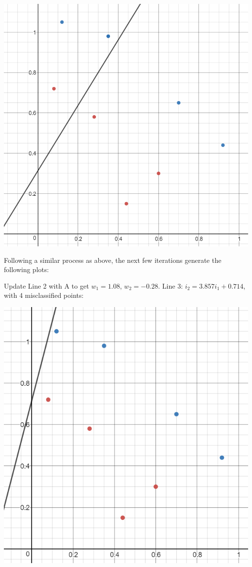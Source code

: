 \documentclass[12pt, letterpaper]{article}
\begin{document}
	\includegraphics[scale=0.6]{"Problem 4/Line 2"}
	
	\medskip 
	Following a similar process as above, the next few iterations generate the following plots:
	
	Update Line 2 with A to get $w_1 = 1.08$, $w_2 = -0.28$. Line 3: $i_2 = 3.857i_1 + 0.714$, with 4 misclassified points:
	\medskip

	\includegraphics[scale=0.6]{"Problem 4/Line 3"}
	
\end{document}
